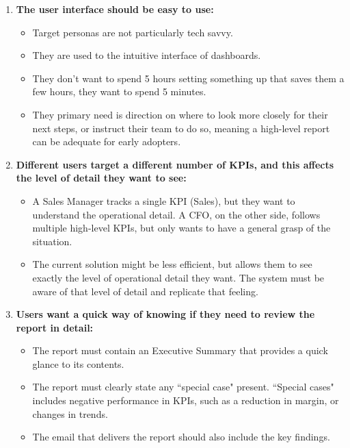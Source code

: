 \documentclass[a4paper]{report}
\begin{document}
\begin{enumerate}
    \item \textbf{The user interface should be easy to use:}
    \begin{itemize}
        \item Target personas are not particularly tech savvy.
        \item They are used to the intuitive interface of dashboards.
        \item They don’t want to spend 5 hours setting something up that saves them a few hours, they want to spend 5 minutes.
        \item They primary need is direction on where to look more closely for their next steps, or instruct their team to do so, meaning a high-level report can be adequate for early adopters.
    \end{itemize}

    \item \textbf{Different users target a different number of KPIs, and this affects the level of detail they want to see:}
    \begin{itemize}
        \item A Sales Manager tracks a single KPI (Sales), but they want to understand the operational detail. A CFO, on the other side, follows multiple high-level KPIs, but only wants to have a general grasp of the situation.
        \item The current solution might be less efficient, but allows them to see exactly the level of operational detail they want. The system must be aware of that level of detail and replicate that feeling.
    \end{itemize}

    \item \textbf{Users want a quick way of knowing if they need to review the report in detail:}
    \begin{itemize}
        \item The report must contain an Executive Summary that provides a quick glance to its contents.
        \item The report must clearly state any ``special case" present. ``Special cases" includes negative performance in KPIs, such as a reduction in margin, or changes in trends.
        \item The email that delivers the report should also include the key findings.
    \end{itemize}
\end{enumerate}
\end{document}
